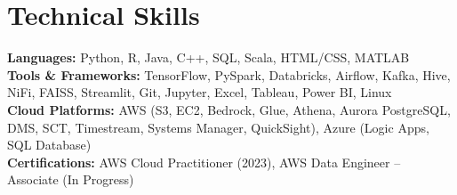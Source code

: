 \documentclass[letterpaper,11pt]{article}
\newcommand{\resumeSubHeadingListEnd}{\end{itemize}}
\begin{document}
                
\section{Technical Skills}
\noindent\small
\small{\item{
\textbf{Languages:} Python, R, Java, C++, SQL, Scala, HTML/CSS, MATLAB \\[3pt]
\textbf{Tools \& Frameworks:} TensorFlow, PySpark, Databricks, Airflow, Kafka, Hive, NiFi, FAISS, Streamlit, Git, Jupyter, Excel, Tableau, Power BI, Linux \\[3pt]
\textbf{Cloud Platforms:} 
AWS (S3, EC2, Bedrock, Glue, Athena, Aurora PostgreSQL, DMS, SCT, Timestream, Systems Manager, QuickSight), Azure (Logic Apps, SQL Database) \\[3pt]
\textbf{Certifications:} AWS Cloud Practitioner (2023), AWS Data Engineer – Associate (In Progress)
\vspace{-8pt}}}
\end{document}
